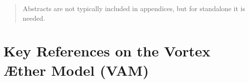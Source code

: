 \documentclass[12pt]{article}
\begin{document}
  \titlepageOpen

  \begin{abstract}
      Abstracts are not typically included in appendices, but for standalone it is needed.
  \end{abstract}

  \titlepageClose
\fi


\section{\papertitle}
\section*{Key References on the Vortex Æther Model (VAM)}
\end{document}
